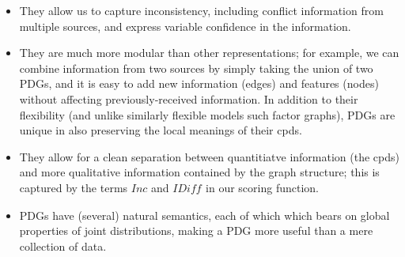 \documentclass{article}
\theoremstyle{plain}
\theoremstyle{definition}
\theoremstyle{remark}
\newcommand{\commentout}[1]{\ignorespaces}
\newcommand{\IBal}[1]{\mathit{IDiff}_{#1}}
\newcommand\Inc{\mathit{Inc}}
\numberwithin{equation}{section}
\begin{document}
\begin{itemize}
  \item They allow us to capture inconsistency,
including conflict information from multiple sources, and
express variable confidence in the information. 
\item 
They are much more
modular 
than other representations; 
for example, we can
combine information from two sources by simply taking the union of two
PDGs, and it is easy to add new information 
(edges)
and features (nodes)
without affecting previously-received information.
In addition to their flexibility (and unlike similarly flexible models such factor graphs), PDGs are unique in also preserving the local meanings of their cpds. 
\commentout{
In contrast to factor graphs,
restrictions of PDGs continue to 
retain the same local commitment to the meanings of cpds in the
restriction; this is  
As a result, PDGs exhibit both flexibility and locality, making them
uniquely modular. 
}
\item They allow for a clean separation between quantitiatve
  information (the cpds) and more qualitative information contained by
    the graph structure; this is captured by the terms $\Inc$ and $\IBal{}$
  in our scoring function.
\item PDGs have (several) natural semantics,
each of which which bears on global properties of joint distributions,
  making a PDG more useful than a mere collection of
  data. 
\end{itemize}
\end{document}

